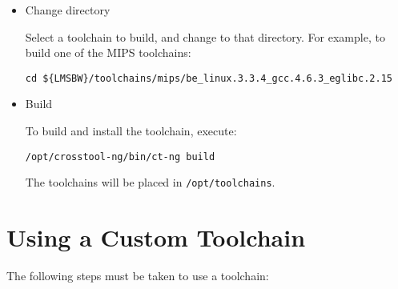 \begin{itemize}
  \item Change directory

    Select a toolchain to build, and change to that directory.  For
    example, to build one of the MIPS toolchains:

\begin{footnotesize}
\begin{verbatim}
cd ${LMSBW}/toolchains/mips/be_linux.3.3.4_gcc.4.6.3_eglibc.2.15
\end{verbatim}
\end{footnotesize}

  \item Build

    To build and install the toolchain, execute:

    \texttt{/opt/crosstool-ng/bin/ct-ng build}

    The toolchains will be placed in \texttt{/opt/toolchains}.
\end{itemize}


\section{Using a Custom Toolchain}

The following steps must be taken to use a toolchain:

